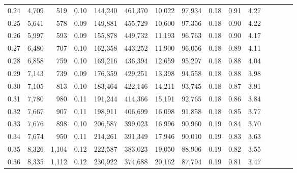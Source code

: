 \begin{tabular}{rrrcrrrrrrrrrrr}
0.24 &   4,709 &    519 &                                       0.10 &  144,240 &  461,370 &   10,022 &   97,934 &  0.18 &  0.91 &                         4.27 \\
0.25 &   5,641 &    578 &                                       0.09 &  149,881 &  455,729 &   10,600 &   97,356 &  0.18 &  0.90 &                         4.22 \\
0.26 &   5,997 &    593 &                                       0.09 &  155,878 &  449,732 &   11,193 &   96,763 &  0.18 &  0.90 &                         4.17 \\
0.27 &   6,480 &    707 &                                       0.10 &  162,358 &  443,252 &   11,900 &   96,056 &  0.18 &  0.89 &                         4.11 \\
0.28 &   6,858 &    759 &                                       0.10 &  169,216 &  436,394 &   12,659 &   95,297 &  0.18 &  0.88 &                         4.04 \\
0.29 &   7,143 &    739 &                                       0.09 &  176,359 &  429,251 &   13,398 &   94,558 &  0.18 &  0.88 &                         3.98 \\
0.30 &   7,105 &    813 &                                       0.10 &  183,464 &  422,146 &   14,211 &   93,745 &  0.18 &  0.87 &                         3.91 \\
0.31 &   7,780 &    980 &                                       0.11 &  191,244 &  414,366 &   15,191 &   92,765 &  0.18 &  0.86 &                         3.84 \\
0.32 &   7,667 &    907 &                                       0.11 &  198,911 &  406,699 &   16,098 &   91,858 &  0.18 &  0.85 &                         3.77 \\
0.33 &   7,676 &    898 &                                       0.10 &  206,587 &  399,023 &   16,996 &   90,960 &  0.19 &  0.84 &                         3.70 \\
0.34 &   7,674 &    950 &                                       0.11 &  214,261 &  391,349 &   17,946 &   90,010 &  0.19 &  0.83 &                         3.63 \\
0.35 &   8,326 &  1,104 &                                       0.12 &  222,587 &  383,023 &   19,050 &   88,906 &  0.19 &  0.82 &                         3.55 \\
0.36 &   8,335 &  1,112 &                                       0.12 &  230,922 &  374,688 &   20,162 &   87,794 &  0.19 &  0.81 &                         3.47 \\

\end{tabular}
